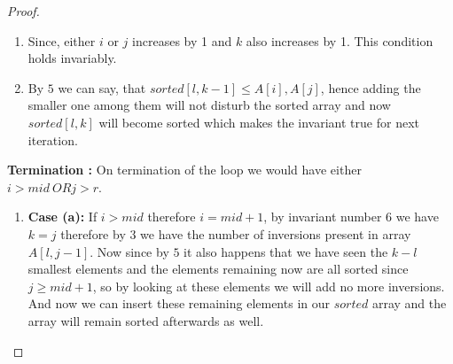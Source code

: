 \documentclass{article}
\begin{document}
{\begin {proof}
\begin{enumerate}[i]
            \item Since, either $i$ or $j$ increases by 1 and $k$ also increases by 1. This condition holds invariably.
            \item By $5$ we can say, that $sorted[l, k-1] \leq A[i],A[j]$, hence adding the smaller one among them will not disturb the sorted array and now $sorted[l, k]$ will become sorted which makes the invariant true for next iteration.
         \end{enumerate}
         \textbf{Termination :} On termination of the loop we would have either $i > mid\ OR j > r$. 
         \begin{enumerate}[i]
            \item {\textbf{Case (a):}} If $i > mid$ therefore $i = mid+1$, by invariant number $6$ we have $k = j$ therefore by $3$ we have the number of inversions present in array $A[l, j-1]$. Now since by $5$ it also happens that we have seen the $k-l$ smallest elements and the elements remaining now are all sorted since $j \geq mid+1$, so by looking at these elements we will add no more inversions. And now we can insert these remaining elements in our $sorted$ array and the array will remain sorted afterwards as well.\\
            

\end{enumerate}
\end{proof}}
\end{document}
